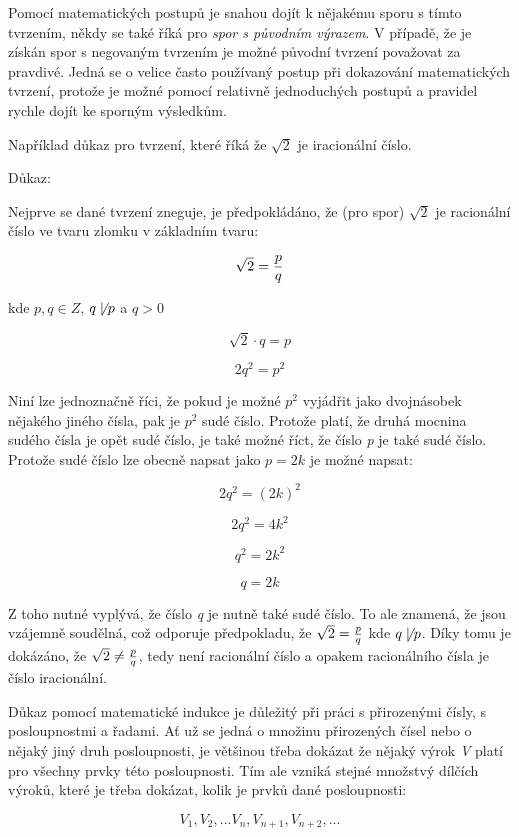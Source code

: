 Pomocí matematických postupů je snahou dojít k nějakému sporu s tímto tvrzením, někdy se také říká pro {\it spor s původním výrazem}. V případě, že je získán spor s negovaným tvrzením je možné původní tvrzení považovat za pravdivé. Jedná se o velice často používaný postup při dokazování matematických tvrzení, protože je možné pomocí relativně jednoduchých postupů a pravidel rychle dojít ke sporným výsledkům.

Například důkaz pro tvrzení, které říká že $\sqrt {2}$ je iracionální číslo.

Důkaz:

Nejprve se dané tvrzení zneguje, je předpokládáno, že (pro spor) $\sqrt {2}$ je racionální číslo ve tvaru zlomku v základním tvaru:

$$\sqrt {2} = {p\over q}$$

kde $p,q \in Z$, $q \not\mid p$ a $q > 0$

$$ \sqrt{2} \cdot q = p $$

$$ 2 q^2 = p^2 $$


Niní lze jednoznačně říci, že pokud je možné $p^2$ vyjádřit jako dvojnásobek nějakého jiného čísla, pak je $p^2$ sudé číslo. Protože platí, že druhá mocnina sudého čísla je opět sudé číslo, je také možné říct, že číslo {\it p} je také sudé číslo. Protože sudé číslo lze obecně napsat jako $p=2k$ je možné napsat:

$$ 2 q^2 = (2k)^2$$

$$ 2 q^2 = 4k^2$$

$$q^2 = 2k^2  $$

$$ q = 2k $$

Z toho nutné vyplývá, že číslo {\it q} je nutně také sudé číslo. To ale znamená, že jsou vzájemně soudělná, což odporuje předpokladu, že $\sqrt{2} ={p\over q}$ kde $q \not\mid p$. Díky tomu je dokázáno, že $\sqrt{2} \not = {p\over q}$, tedy není racionální číslo a opakem racionálního čísla je číslo iracionální.  




Důkaz pomocí matematické indukce je důležitý při práci s přirozenými čísly, s posloupnostmi a řadami. Ať už se jedná o množinu přirozených čísel nebo o nějaký jiný druh posloupnosti, je většinou třeba dokázat že nějaký výrok {\it V} platí pro všechny prvky této posloupnosti. Tím ale vzniká stejné množstvý dílčích výroků, které je třeba dokázat, kolik je prvků dané posloupnosti:

$$ V_1, V_2, ... V_n, V_{n+1}, V_{n+2}, ... $$

